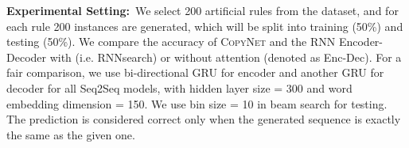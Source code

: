\textbf{Experimental Setting:}~We select 200 artificial rules from the dataset, and for each rule 200 instances are generated, which will be split into training (50\%) and testing (50\%).  We compare the  accuracy of \textsc{CopyNet} and the RNN Encoder-Decoder with (i.e. RNNsearch) or without attention (denoted as Enc-Dec).
For a fair comparison, we use bi-directional GRU for encoder and another GRU for decoder  for all Seq2Seq models, with hidden layer size = 300 and word embedding dimension = 150. We use bin size = 10 in beam search for testing. The prediction is considered correct only when the generated sequence is exactly the same as the given one. 

